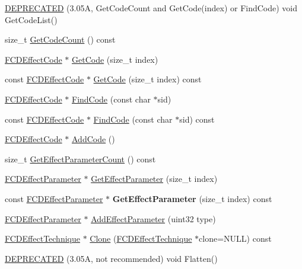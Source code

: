 \begin{DoxyCompactItemize}
\hyperlink{classFCDEffectTechnique_a0f2d38037a7fbfb2f80913148d2ea68e}{DEPRECATED} (3.05A, GetCodeCount and GetCode(index) or FindCode) void GetCodeList()
\item 
size\_\-t \hyperlink{classFCDEffectTechnique_ab9f545e1ae37dd7bd8ef17bd2d533b85}{GetCodeCount} () const 
\item 
\hyperlink{classFCDEffectCode}{FCDEffectCode} $\ast$ \hyperlink{classFCDEffectTechnique_a055752fffaa859ba4b300fc5e1668307}{GetCode} (size\_\-t index)
\item 
const \hyperlink{classFCDEffectCode}{FCDEffectCode} $\ast$ \hyperlink{classFCDEffectTechnique_ac1bfa956e08f14bd17dcc9dd5c397833}{GetCode} (size\_\-t index) const 
\item 
\hyperlink{classFCDEffectCode}{FCDEffectCode} $\ast$ \hyperlink{classFCDEffectTechnique_aa1d2ca97bd7e689527c2d7a579f0f9ca}{FindCode} (const char $\ast$sid)
\item 
const \hyperlink{classFCDEffectCode}{FCDEffectCode} $\ast$ \hyperlink{classFCDEffectTechnique_ac4a6ee7e3bac9f19eaa9ed77fc36eca4}{FindCode} (const char $\ast$sid) const 
\item 
\hyperlink{classFCDEffectCode}{FCDEffectCode} $\ast$ \hyperlink{classFCDEffectTechnique_aa532d3dff7c9c8f159a16811c7cdcf20}{AddCode} ()
\item 
size\_\-t \hyperlink{classFCDEffectTechnique_a58c423415223bbe1ada049c770562f74}{GetEffectParameterCount} () const 
\item 
\hyperlink{classFCDEffectParameter}{FCDEffectParameter} $\ast$ \hyperlink{classFCDEffectTechnique_a0cf4e90aeff863f03f183e0c3e791df0}{GetEffectParameter} (size\_\-t index)
\item 
\hypertarget{classFCDEffectTechnique_a5539b314ef3f3b0460513f4025cfdb97}{
const \hyperlink{classFCDEffectParameter}{FCDEffectParameter} $\ast$ {\bfseries GetEffectParameter} (size\_\-t index) const }
\label{classFCDEffectTechnique_a5539b314ef3f3b0460513f4025cfdb97}

\item 
\hyperlink{classFCDEffectParameter}{FCDEffectParameter} $\ast$ \hyperlink{classFCDEffectTechnique_af52fac53bb63d670d5c580b500d15719}{AddEffectParameter} (uint32 type)
\item 
\hyperlink{classFCDEffectTechnique}{FCDEffectTechnique} $\ast$ \hyperlink{classFCDEffectTechnique_ae810ec6ecd9b3baec142868f62dfe154}{Clone} (\hyperlink{classFCDEffectTechnique}{FCDEffectTechnique} $\ast$clone=NULL) const 
\item 
\hyperlink{classFCDEffectTechnique_a6f0456eaec5bf45c469a7d9be98cc4ce}{DEPRECATED} (3.05A, not recommended) void Flatten()
\end{DoxyCompactItemize}


